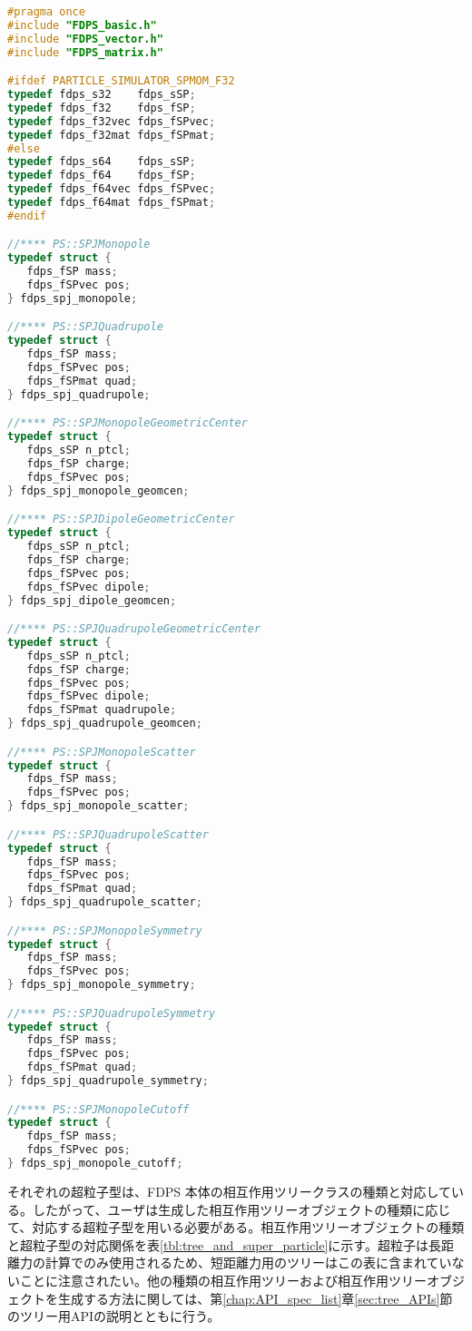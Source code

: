 \begin{lstlisting}[language=C,caption=超粒子型 (C言語)]
#pragma once
#include "FDPS_basic.h"
#include "FDPS_vector.h"
#include "FDPS_matrix.h"

#ifdef PARTICLE_SIMULATOR_SPMOM_F32
typedef fdps_s32    fdps_sSP;
typedef fdps_f32    fdps_fSP;
typedef fdps_f32vec fdps_fSPvec;
typedef fdps_f32mat fdps_fSPmat;
#else
typedef fdps_s64    fdps_sSP;
typedef fdps_f64    fdps_fSP;
typedef fdps_f64vec fdps_fSPvec;
typedef fdps_f64mat fdps_fSPmat;
#endif

//**** PS::SPJMonopole
typedef struct {
   fdps_fSP mass;
   fdps_fSPvec pos;
} fdps_spj_monopole;

//**** PS::SPJQuadrupole
typedef struct {
   fdps_fSP mass;
   fdps_fSPvec pos;
   fdps_fSPmat quad;
} fdps_spj_quadrupole;

//**** PS::SPJMonopoleGeometricCenter
typedef struct {
   fdps_sSP n_ptcl;
   fdps_fSP charge;
   fdps_fSPvec pos;
} fdps_spj_monopole_geomcen;

//**** PS::SPJDipoleGeometricCenter
typedef struct {
   fdps_sSP n_ptcl;
   fdps_fSP charge;
   fdps_fSPvec pos;
   fdps_fSPvec dipole;
} fdps_spj_dipole_geomcen;

//**** PS::SPJQuadrupoleGeometricCenter
typedef struct {
   fdps_sSP n_ptcl;
   fdps_fSP charge;
   fdps_fSPvec pos;
   fdps_fSPvec dipole;
   fdps_fSPmat quadrupole;
} fdps_spj_quadrupole_geomcen;

//**** PS::SPJMonopoleScatter
typedef struct {
   fdps_fSP mass;
   fdps_fSPvec pos;
} fdps_spj_monopole_scatter;

//**** PS::SPJQuadrupoleScatter
typedef struct {
   fdps_fSP mass;
   fdps_fSPvec pos;
   fdps_fSPmat quad;
} fdps_spj_quadrupole_scatter;

//**** PS::SPJMonopoleSymmetry
typedef struct {
   fdps_fSP mass;
   fdps_fSPvec pos;
} fdps_spj_monopole_symmetry;

//**** PS::SPJQuadrupoleSymmetry
typedef struct {
   fdps_fSP mass;
   fdps_fSPvec pos;
   fdps_fSPmat quad;
} fdps_spj_quadrupole_symmetry;

//**** PS::SPJMonopoleCutoff
typedef struct {
   fdps_fSP mass;
   fdps_fSPvec pos;
} fdps_spj_monopole_cutoff;
\end{lstlisting}

それぞれの超粒子型は、FDPS 本体の相互作用ツリークラスの種類と対応している。したがって、ユーザは生成した相互作用ツリーオブジェクトの種類に応じて、対応する超粒子型を用いる必要がある。相互作用ツリーオブジェクトの種類と超粒子型の対応関係を表\ref{tbl:tree_and_super_particle}に示す。超粒子は長距離力の計算でのみ使用されるため、短距離力用のツリーはこの表に含まれていないことに注意されたい。他の種類の相互作用ツリーおよび相互作用ツリーオブジェクトを生成する方法に関しては、第\ref{chap:API_spec_list}章\ref{sec:tree_APIs}節のツリー用APIの説明とともに行う。


